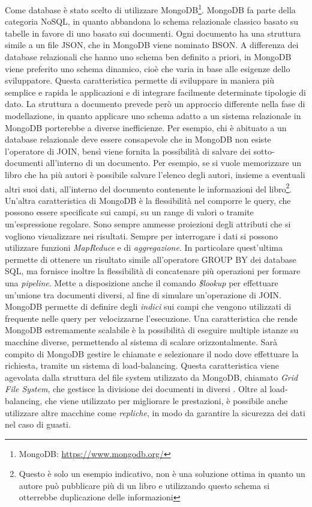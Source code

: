 Come database è stato scelto di utilizzare MongoDB\footnote{MongoDB: \url{https://www.mongodb.org/}}. MongoDB fa parte della categoria NoSQL, in quanto abbandona lo schema relazionale classico basato su tabelle in favore di uno basato sui documenti. Ogni documento ha una struttura simile a un file JSON, che in MongoDB viene nominato BSON. A differenza dei database relazionali che hanno uno schema ben definito a priori, in MongoDB viene preferito uno schema dinamico, cioè che varia in base alle esigenze dello sviluppatore. Questa caratteristica permette di sviluppare in maniera più semplice e rapida le applicazioni e di integrare facilmente determinate tipologie di dato. La struttura a documento prevede però un approccio differente nella fase di modellazione, in quanto applicare uno schema adatto a un sistema relazionale in MongoDB porterebbe a diverse inefficienze. Per esempio, chi è abituato a un database relazionale deve essere consapevole che in MongoDB non esiste l'operatore di JOIN, bensì viene fornita la possibilità di salvare dei sotto-documenti all'interno di un documento. Per esempio, se si vuole memorizzare un libro che ha più autori è possibile salvare l'elenco degli autori, insieme a eventuali altri suoi dati, all'interno del documento contenente le informazioni del libro\footnote{Questo è solo un esempio indicativo, non è una soluzione ottima in quanto un autore può pubblicare più di un libro e utilizzando questo schema si otterrebbe duplicazione delle informazioni}. Un'altra caratteristica di MongoDB è la flessibilità nel comporre le query, che possono essere specificate sui campi, su un range di valori o tramite un'espressione regolare. Sono sempre ammesse proiezioni degli attributi che si vogliono visualizzare nei risultati. Sempre per interrogare i dati si possono utilizzare funzioni \emph{MapReduce} e di \emph{aggregazione}. In particolare quest'ultima permette di ottenere un risultato simile all'operatore GROUP BY dei database SQL, ma fornisce inoltre la flessibilità di concatenare più operazioni per formare una \emph{pipeline}. Mette a disposizione anche il comando \emph{\$lookup} per effettuare un'unione tra documenti diversi, al fine di simulare un'operazione di JOIN. MongoDB permette di definire degli \emph{indici} sui campi che vengono utilizzati di frequente nelle query per velocizzarne l'esecuzione. Una caratteristica che rende MongoDB estremamente scalabile è la possibilità di eseguire multiple istanze su macchine diverse, permettendo al sistema di scalare orizzontalmente. Sarà compito di MongoDB gestire le chiamate e selezionare il nodo dove effettuare la richiesta, tramite un sistema di load-balancing. Questa caratteristica viene agevolata dalla struttura del file system utilizzato da MongoDB, chiamato \emph{Grid File System}, che gestisce la divisione dei documenti in diversi . Oltre al load-balancing, che viene utilizzato per migliorare le prestazioni, è possibile anche utilizzare altre macchine come \emph{repliche}, in modo da garantire la sicurezza dei dati nel caso di guasti.


